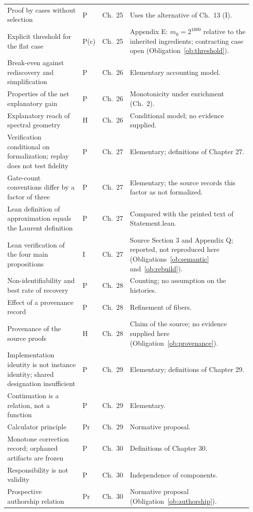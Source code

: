 \documentclass[11pt,letterpaper]{report}
\theoremstyle{plain}
\theoremstyle{definition}
\theoremstyle{remark}
\begin{document}
{\begin{longtable}{p{}p{}p{}p{}}
Proof by cases without selection & P & Ch.\ 25 & Uses the alternative of Ch.\ 13 (I).\\
Explicit threshold for the flat case & P(c) & Ch.\ 25 & Appendix E: $m_0=2^{1600}$ relative to the inherited ingredients; contracting case open (Obligation~\ref{ob:threshold}).\\
Break-even against rediscovery and simplification & P & Ch.\ 26 & Elementary accounting model.\\
Properties of the net explanatory gain & P & Ch.\ 26 & Monotonicity under enrichment (Ch.\ 2).\\
Explanatory reach of spectral geometry & H & Ch.\ 26 & Conditional model; no evidence supplied.\\
Verification conditional on formalization; replay does not test fidelity & P & Ch.\ 27 & Elementary; definitions of Chapter 27.\\
Gate-count conventions differ by a factor of three & P & Ch.\ 27 & Elementary; the source records this factor as not formalized.\\
Lean definition of approximation equals the Laurent definition & P & Ch.\ 27 & Compared with the printed text of Statement.lean.\\
Lean verification of the four main propositions & I & Ch.\ 27 & Source Section 3 and Appendix Q; reported, not reproduced here (Obligations~\ref{ob:semantic} and~\ref{ob:rebuild}).\\
Non-identifiability and best rate of recovery & P & Ch.\ 28 & Counting; no assumption on the histories.\\
Effect of a provenance record & P & Ch.\ 28 & Refinement of fibers.\\
Provenance of the source proofs & H & Ch.\ 28 & Claim of the source; no evidence supplied here (Obligation~\ref{ob:provenance}).\\
Implementation identity is not instance identity; shared designation insufficient & P & Ch.\ 29 & Elementary; definitions of Chapter 29.\\
Continuation is a relation, not a function & P & Ch.\ 29 & Elementary.\\
Calculator principle & Pr & Ch.\ 29 & Normative proposal.\\
Monotone correction record; orphaned artifacts are frozen & P & Ch.\ 30 & Definitions of Chapter 30.\\
Responsibility is not validity & P & Ch.\ 30 & Independence of components.\\
Prospective authorship relation & Pr & Ch.\ 30 & Normative proposal (Obligation~\ref{ob:authorship}).\\

\end{longtable}}
\end{document}
